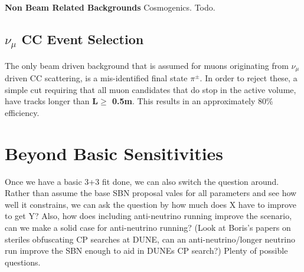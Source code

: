 \documentclass[12pt, a4paper]{article}
\begin{document}
{\bf Non Beam Related Backgrounds}
Cosmogenics. Todo.

\subsection{$\nu_\mu$ CC Event Selection}
The only beam driven background that is assumed for muons originating from $\nu_\mu$ driven CC scattering, is a mis-identified final state $\pi^\pm$. In order to reject these, a simple cut requiring that all muon candidates that do stop in the active volume, have tracks longer than {\bf{$\bm{L \geq}$ 0.5m}}. This results in an approximately 80\% efficiency. 


\section{Beyond Basic Sensitivities}
Once we have a basic 3+3 fit done, we can also switch the question around. Rather than assume the base SBN proposal vales for all parameters and see how well it constrains, we can ask the question by how much does X have to improve to get Y? Also, how does including anti-neutrino running improve the scenario, can we make a solid case for anti-neutrino running? (Look at Boris's papers on steriles obfuscating CP searches at DUNE, can an anti-neutrino/longer neutrino run improve the SBN enough to aid in DUNEs CP search?) Plenty of possible questions. 
\end{document}
